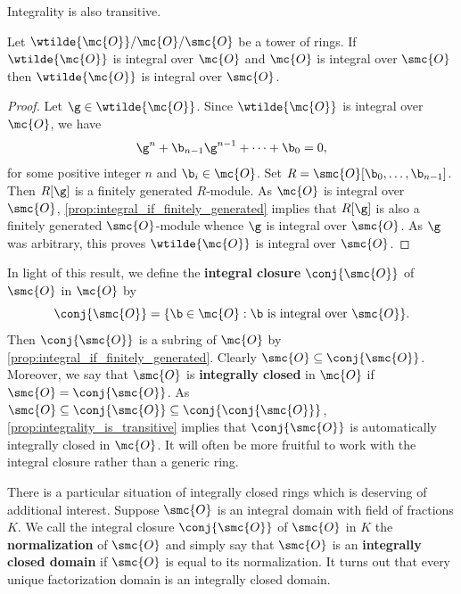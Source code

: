     Integrality is also transitive.

    \begin{proposition}\label{prop:integrality_is_transitive}
      Let \(\wtilde{\mc{O}}/\mc{O}/\smc{O}\) be a tower of rings. If \(\wtilde{\mc{O}}\) is integral over \(\mc{O}\) and \(\mc{O}\) is integral over \(\smc{O}\) then \(\wtilde{\mc{O}}\) is integral over \(\smc{O}\).
    \end{proposition}
    \begin{proof}
      Let \(\g \in \wtilde{\mc{O}}\). Since \(\wtilde{\mc{O}}\) is integral over \(\mc{O}\), we have
      \[
        \g^{n}+\b_{n-1}\g^{n-1}+\cdots+\b_{0} = 0,
      \]
      for some positive integer \(n\) and \(\b_{i} \in \mc{O}\). Set \(R = \smc{O}[\b_{0},\ldots,\b_{n-1}]\). Then \(R[\g]\) is a finitely generated \(R\)-module. As \(\mc{O}\) is integral over \(\smc{O}\), \cref{prop:integral_if_finitely_generated} implies that \(R[\g]\) is also a finitely generated \(\smc{O}\)-module whence \(\g\) is integral over \(\smc{O}\). As \(\g\) was arbitrary, this proves \(\wtilde{\mc{O}}\) is integral over \(\smc{O}\).
    \end{proof}

    In light of this result, we define the \textbf{integral closure} \(\conj{\smc{O}}\) of \(\smc{O}\) in \(\mc{O}\) by
    \[
      \conj{\smc{O}} = \{\b \in \mc{O}:\b \text{ is integral over } \smc{O}\}.
    \]
    Then \(\conj{\smc{O}}\) is a subring of \(\mc{O}\) by \cref{prop:integral_if_finitely_generated}. Clearly \(\smc{O} \subseteq \conj{\smc{O}}\). Moreover, we say that \(\smc{O}\) is \textbf{integrally closed} in \(\mc{O}\) if \(\smc{O} = \conj{\smc{O}}\). As \(\smc{O} \subseteq \conj{\smc{O}} \subseteq \conj{\conj{\smc{O}}}\), \cref{prop:integrality_is_transitive} implies that \(\conj{\smc{O}}\) is automatically integrally closed in \(\mc{O}\). It will often be more fruitful to work with the integral closure rather than a generic ring.
    
    There is a particular situation of integrally closed rings which is deserving of additional interest. Suppose \(\smc{O}\) is an integral domain with field of fractions \(K\). We call the integral closure \(\conj{\smc{O}}\) of \(\smc{O}\) in \(K\) the \textbf{normalization} of \(\smc{O}\) and simply say that \(\smc{O}\) is an \textbf{integrally closed domain} if \(\smc{O}\) is equal to its normalization. It turns out that every unique factorization domain is an integrally closed domain.

